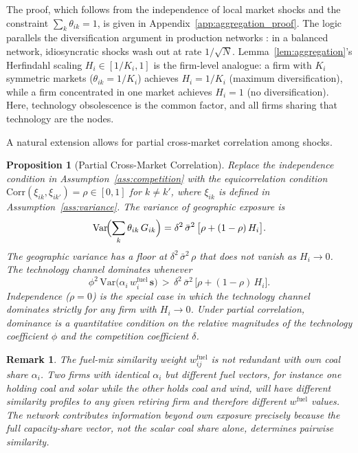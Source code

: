 \documentclass[12pt,a4paper]{article}
\newtheorem{proposition}{Proposition}
\newtheorem{remark}{Remark}
\begin{document}
\noindent The proof, which follows from the independence of local market shocks and the constraint $\sum_k \theta_{ik} = 1$, is given in Appendix~\ref{app:aggregation_proof}. The logic parallels the diversification argument in production networks \citep{AcemogluCarvalhoOzdaglarTahbazSalehi2012}: in a balanced network, idiosyncratic shocks wash out at rate $1/\sqrt{N}$. Lemma~\ref{lem:aggregation}'s Herfindahl scaling $H_i \in [1/K_i, 1]$ is the firm-level analogue: a firm with $K_i$ symmetric markets ($\theta_{ik} = 1/K_i$) achieves $H_i = 1/K_i$ (maximum diversification), while a firm concentrated in one market achieves $H_i = 1$ (no diversification). Here, technology obsolescence is the common factor, and all firms sharing that technology are the nodes.

A natural extension allows for partial cross-market correlation among shocks.

\begin{proposition}[Partial Cross-Market Correlation]\label{prop:partial_correlation}
    Replace the independence condition in Assumption~\ref{ass:competition} with the equicorrelation condition $\mathrm{Corr}(\xi_{ik}, \xi_{ik'}) = \rho \in [0,1]$ for $k \neq k'$, where $\xi_{ik}$ is defined in Assumption~\ref{ass:variance}. The variance of geographic exposure is
    \[
    \mathrm{Var}\!\Bigl(\sum_k \theta_{ik}\, G_{ik}\Bigr) = \delta^2\, \bar{\sigma}^2\, \bigl[\rho + (1-\rho)\, H_i\bigr].
    \]
    The geographic variance has a floor at $\delta^2\,\bar{\sigma}^2\,\rho$ that does not vanish as $H_i\to 0$. The technology channel dominates whenever
    \[
    \phi^2\,\mathrm{Var}\!\bigl(\alpha_i\, w^{\mathrm{fuel}}_i\,\mathbf{s}\bigr) \,>\, \delta^2\,\bar{\sigma}^2\,\bigl[\rho + (1-\rho)\, H_i\bigr].
    \]
    Independence ($\rho=0$) is the special case in which the technology channel dominates strictly for any firm with $H_i\to 0$. Under partial correlation, dominance is a quantitative condition on the relative magnitudes of the technology coefficient $\phi$ and the competition coefficient $\delta$.
\end{proposition}

\begin{remark}\label{rem:network_valueadded}
    The fuel-mix similarity weight $w^{\mathrm{fuel}}_{ij}$ is not redundant with own coal share $\alpha_i$. Two firms with identical $\alpha_i$ but different fuel vectors, for instance one holding coal and solar while the other holds coal and wind, will have different similarity profiles to any given retiring firm and therefore different $w^{\mathrm{fuel}}$ values. The network contributes information beyond own exposure precisely because the full capacity-share vector, not the scalar coal share alone, determines pairwise similarity.
\end{remark}
\end{document}
